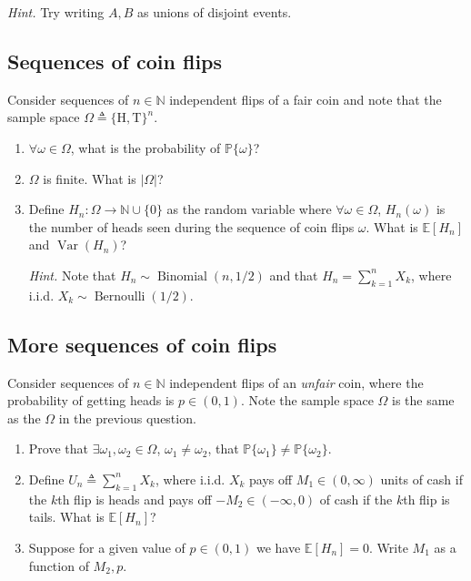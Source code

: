 \documentclass{article}
\numberwithin{equation}{section}
\begin{document}
\textit{Hint.} Try writing $ A, B $ as unions of disjoint events.

\subsection{Sequences of coin flips}

Consider sequences of $ n \in \mathbb{N} $ independent flips of a fair coin
and note that the sample space $ \Omega \triangleq \{\text{H}, \text{T}\}^n $.
\begin{enumerate}[label = \alph*.]
    \item
    $ \forall \omega \in \Omega $, what is the probability of
    $ \mathbb{P}\{\omega\} $?

    \item
    $ \Omega $ is finite. What is $ |\Omega| $?

    \item
    Define $ H_n : \Omega \rightarrow \mathbb{N} \cup \{0\} $ as the random
    variable where $ \forall \omega \in \Omega $, $ H_n(\omega) $ is the
    number of heads seen during the sequence of coin flips $ \omega $. What
    is $ \mathbb{E}[H_n] $ and $ \operatorname{Var}(H_n) $?

    \medskip
    
    \textit{Hint.} Note that $ H_n \sim \operatorname{Binomial}(n, 1 / 2) $
    and that $ H_n = \sum_{k = 1}^nX_k $, where i.i.d.
    $ X_k \sim \operatorname{Bernoulli}(1 / 2) $.
\end{enumerate}

\subsection{More sequences of coin flips}

Consider sequences of $ n \in \mathbb{N} $ independent flips of an
\textit{unfair} coin, where the probability of getting heads is
$ p \in (0, 1) $. Note the sample space $ \Omega $ is the same as the
$ \Omega $ in the previous question.
\begin{enumerate}[label = \alph*.]
    \item
    Prove that $ \exists \omega_1, \omega_2 \in \Omega $,
    $ \omega_1 \ne \omega_2 $, that $ \mathbb{P}\{\omega_1\} \ne
    \mathbb{P}\{\omega_2\} $.

    \item
    Define $ U_n \triangleq \sum_{k = 1}^nX_k $, where i.i.d.
    $ X_k $ pays off $ M_1 \in (0, \infty) $ units of cash if the $ k $th
    flip is heads and pays off $ -M_2 \in (-\infty, 0) $ of cash if the
    $ k $th flip is tails. What is $ \mathbb{E}[H_n] $?

    \item
    Suppose for a given value of $ p \in (0, 1) $ we have
    $ \mathbb{E}[H_n] = 0 $. Write $ M_1 $ as a function of $ M_2, p $.
\end{enumerate}
\end{document}
